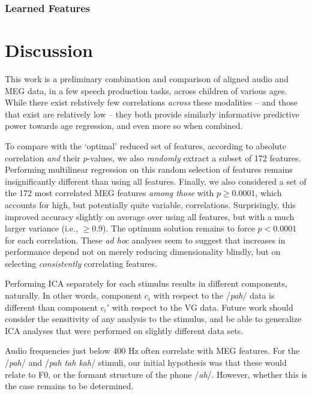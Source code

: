 \documentclass[utf8]{frontiersSCNS} %
\begin{document}
\subsubsection{Learned Features}

\section{Discussion}


This work is a preliminary combination and comparison of aligned audio and MEG data, in a few speech production tasks, across children of various ages. While there exist relatively few correlations {\em across} these modalities -- and those that exist are relatively low -- they both provide similarly informative predictive power towards age regression, and even more so when combined.

To compare with the `optimal' reduced set of features, according to absolute correlation {\em and} their $p$-values, we also {\em randomly} extract a subset of 172 features. Performing multilinear regression on this random selection of features remains insignificantly different than using all features. Finally, we also considered a set of the 172 most correlated MEG features {\em among those} with $p \geq 0.0001$, which accounts for high, but potentially quite variable, correlations. Surprisingly, this improved accuracy slightly on average over using all features, but with a much larger variance (i.e., $\geq 0.9$). The optimum solution remains to force $p<0.0001$ for each correlation. These {\em ad hoc} analyses seem to suggest that increases in performance depend not on merely reducing dimensionality blindly, but on selecting {\em consistently} correlating features.

Performing ICA separately for each stimulus results in different components, naturally. In other words, component $c_i$ with respect to the /{\em pah}/ data is different than component $c_i'$ with respect to the VG data. Future work should consider the sensitivity of any analysis to the stimulus, and be able to generalize ICA analyses that were performed on slightly different data sets.

Audio frequencies just below 400 Hz often correlate with MEG features. For the /{\em pah}/ and /{\em pah tah kah}/ stimuli, our initial hypothesis was that these would relate to F0, or the formant structure of the phone /{\em ah}/. However, whether this is the case remains to be determined.
\end{document}
